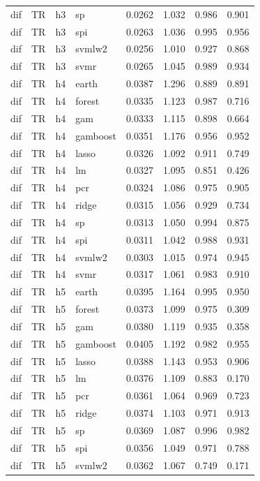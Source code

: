 \begin{ThreePartTable}
\begin{longtable}[t]{llclcccc}
dif & TR & h3 & sp & 0.0262 & 1.032 & 0.986 & 0.901\\
dif & TR & h3 & spi & 0.0263 & 1.036 & 0.995 & 0.956\\
dif & TR & h3 & svmlw2 & 0.0256 & 1.010 & 0.927 & 0.868\\
dif & TR & h3 & svmr & 0.0265 & 1.045 & 0.989 & 0.934\\
\addlinespace
dif & TR & h4 & earth & 0.0387 & 1.296 & 0.889 & 0.891\\
dif & TR & h4 & forest & 0.0335 & 1.123 & 0.987 & 0.716\\
dif & TR & h4 & gam & 0.0333 & 1.115 & 0.898 & 0.664\\
dif & TR & h4 & gamboost & 0.0351 & 1.176 & 0.956 & 0.952\\
dif & TR & h4 & lasso & 0.0326 & 1.092 & 0.911 & 0.749\\
dif & TR & h4 & lm & 0.0327 & 1.095 & 0.851 & 0.426\\
dif & TR & h4 & pcr & 0.0324 & 1.086 & 0.975 & 0.905\\
dif & TR & h4 & ridge & 0.0315 & 1.056 & 0.929 & 0.734\\
dif & TR & h4 & sp & 0.0313 & 1.050 & 0.994 & 0.875\\
dif & TR & h4 & spi & 0.0311 & 1.042 & 0.988 & 0.931\\
dif & TR & h4 & svmlw2 & 0.0303 & 1.015 & 0.974 & 0.945\\
dif & TR & h4 & svmr & 0.0317 & 1.061 & 0.983 & 0.910\\
\addlinespace
dif & TR & h5 & earth & 0.0395 & 1.164 & 0.995 & 0.950\\
dif & TR & h5 & forest & 0.0373 & 1.099 & 0.975 & 0.309\\
dif & TR & h5 & gam & 0.0380 & 1.119 & 0.935 & 0.358\\
dif & TR & h5 & gamboost & 0.0405 & 1.192 & 0.982 & 0.955\\
dif & TR & h5 & lasso & 0.0388 & 1.143 & 0.953 & 0.906\\
dif & TR & h5 & lm & 0.0376 & 1.109 & 0.883 & 0.170\\
dif & TR & h5 & pcr & 0.0361 & 1.064 & 0.969 & 0.723\\
dif & TR & h5 & ridge & 0.0374 & 1.103 & 0.971 & 0.913\\
dif & TR & h5 & sp & 0.0369 & 1.087 & 0.996 & 0.982\\
dif & TR & h5 & spi & 0.0356 & 1.049 & 0.971 & 0.788\\
dif & TR & h5 & svmlw2 & 0.0362 & 1.067 & 0.749 & 0.171\\

\end{longtable}
\end{ThreePartTable}
